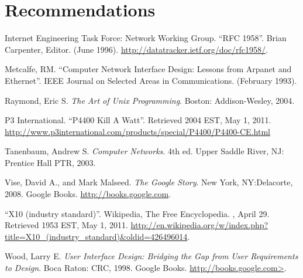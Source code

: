 \documentclass[12pt]{article}
\begin{document}
\section{Recommendations}


\renewcommand{\refname}{\section{References}}
\begin{thebibliography}{10}

 Internet Engineering Task Force: Network Working Group.
  \newblock ``RFC 1958''.
  \newblock Brian Carpenter, Editor.
  \newblock (June 1996).
  \newblock \url{http://datatracker.ietf.org/doc/rfc1958/}.

 Metcalfe, RM.
  \newblock ``Computer Network Interface Design: Lessons from
  Arpanet and Ethernet''.
  \newblock IEEE Journal on Selected Areas in Communications.
  \newblock (February 1993).

 Raymond, Eric S.
  \newblock \emph{The Art of Unix Programming}.
  \newblock Boston: Addison-Wesley, 2004.

 P3 International.
  \newblock ``P4400 Kill A Watt''.
  \newblock Retrieved 2004 EST, May 1, 2011.
  \newblock \url{http://www.p3international.com/products/special/P4400/P4400-CE.html}

 Tanenbaum, Andrew S.
  \newblock \emph{Computer Networks}. 4th ed.
  \newblock Upper Saddle River, NJ: Prentice Hall PTR, 2003.

 Vise, David A., and Mark Malseed.
  \newblock \emph{The Google Story}.
  \newblock New York, NY:Delacorte, 2008.
  \newblock Google Books.
  \newblock \url{http://books.google.com}.

 ``X10 (industry standard)''.
  \newblock Wikipedia, The Free Encyclopedia.
  , April 29.  Retrieved 1953 EST, May 1, 2011.
  \newblock \url{http://en.wikipedia.org/w/index.php?title=X10_(industry_standard)&oldid=426496014}.

 Wood, Larry E.
  \newblock \emph{User Interface Design: Bridging the Gap from User
    Requirements to Design}.
  \newblock Boca Raton: CRC, 1998.
  \newblock Google Books.
  \newblock \url{http://books.google.com>}.

\end{thebibliography}

\pagebreak
\end{document}
